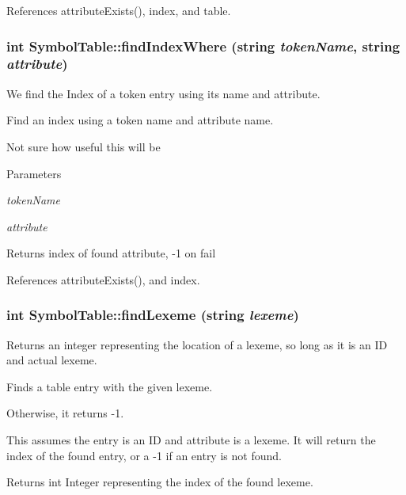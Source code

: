 References attributeExists(), index, and table.

\hypertarget{classSymbolTable_a61a3da421ef79fffe47e8e2d3065bb05}{
\subsubsection[{findIndexWhere}]{\setlength{\rightskip}{0pt plus 5cm}int SymbolTable::findIndexWhere (string {\em tokenName}, \/  string {\em attribute})}}
\label{classSymbolTable_a61a3da421ef79fffe47e8e2d3065bb05}


We find the Index of a token entry using its name and attribute. 

Find an index using a token name and attribute name.

Not sure how useful this will be 
\begin{DoxyParams}{Parameters}
\item[{\em tokenName}]\item[{\em attribute}]\end{DoxyParams}
\begin{DoxyReturn}{Returns}
index of found attribute, -\/1 on fail 
\end{DoxyReturn}


References attributeExists(), and index.

\hypertarget{classSymbolTable_a33fa9fe363246a0b54e9f58191ad931e}{
\subsubsection[{findLexeme}]{\setlength{\rightskip}{0pt plus 5cm}int SymbolTable::findLexeme (string {\em lexeme})}}
\label{classSymbolTable_a33fa9fe363246a0b54e9f58191ad931e}


Returns an integer representing the location of a lexeme, so long as it is an ID and actual lexeme. 

Finds a table entry with the given lexeme.

Otherwise, it returns -\/1.

This assumes the entry is an ID and attribute is a lexeme. It will return the index of the found entry, or a -\/1 if an entry is not found. \begin{DoxyReturn}{Returns}
int Integer representing the index of the found lexeme. 
\end{DoxyReturn}


